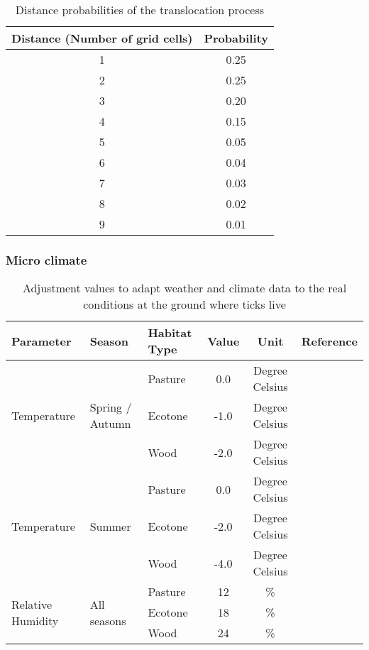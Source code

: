 \documentclass[a4paper, 11pt]{scrartcl}
\begin{document}
\begin{table}[h!]
\caption{Distance probabilities of the translocation process}
\label{tab:distance_probabilities}
\begin{tabular}{@{}cc@{}}
\toprule
\textbf{Distance (Number of grid cells)}	& \textbf{Probability}	\\
\midrule
1 	& 0.25 \\
2	& 0.25 \\
3	& 0.20 \\
4	& 0.15 \\
5	& 0.05 \\
6	& 0.04 \\
7	& 0.03 \\
8	& 0.02 \\
9	& 0.01 \\
\bottomrule
\end{tabular}
\end{table}


\subsubsection{Micro climate}

\begin{table}[h!]
\caption{Adjustment values to adapt weather and climate data to the real conditions at the ground where ticks live}
\label{tab:micro_climate_adjustments}
\begin{tabular}{@{}lllccl@{}}
\toprule
\textbf{Parameter}					& \textbf{Season} 					& \textbf{Habitat Type}  & \textbf{Value}  	& \textbf{Unit} & \textbf{Reference}  	\\
\midrule
\multirow{3}{*}{Temperature} 		& \multirow{3}{*}{Spring / Autumn}  & Pasture 				 &   0.0   			&   Degree Celsius	&            		    \\
									&									& Ecotone 				 &   -1.0 	  		&   Degree Celsius &	    				\\
									&					 				& Wood    				 &   -2.0   		&   Degree Celsius &	    				\\
\midrule
\multirow{3}{*}{Temperature} 		& \multirow{3}{*}{Summer}        	& Pasture 				 &   0.0    		&	Degree Celsius	&          				\\
									&				 	 				& Ecotone 				 &  -2.0    		&  	Degree Celsius	& ~\cite{Geiger.1995}  	\\
									&				 	 				& Wood	   				 &  -4.0    		&  	Degree Celsius	& ~\cite{Bonan.2016}   	\\
\midrule
\multirow{3}{*}{Relative Humidity}  & \multirow{3}{*}{All seasons}      & Pasture 				 &   12   			&  	\%			&            		    \\
									&				 					& Ecotone 				 &   18    			&   \%    		&					    \\
									&				 					& Wood    				 &   24    			&  	\%			& ~\cite{Boehnke.2017} 	\\
\bottomrule
\end{tabular}
\end{table}



\newpage
\printbibliography[heading = bibintoc, title = {Bibliography}]
\end{document}
